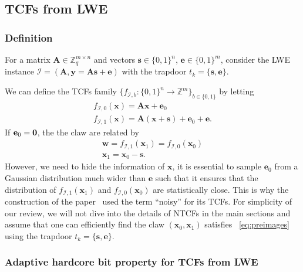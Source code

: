 \documentclass[cryptography,review,submit,pdftex,moreauthors,amsmath,amssymb,aps,strict]{Definitions/mdpi}
\begin{document}
\subsection{TCFs from LWE}
\subsubsection{Definition}
For a matrix $\mathbf{A}\in\mathbb{Z}^{m\times n}_q$ and vectors $\mathbf{s}\in\{0,1\}^n$, $\mathbf{e}\in\{0,1\}^{m}$, consider the LWE instance $\mathcal{I}=(\mathbf{A},\mathbf{y}=\mathbf{A}\mathbf{s}+\mathbf{e})$ with the trapdoor $t_k=\{\mathbf{s},\mathbf{e}\}$. 

We can define the TCFs family  $\{f_{\mathcal{I},b}:\{0,1\}^n\to\mathbb{Z}^{m}\}_{b\in\{0,1\}}$ by letting 
\begin{align}
    f_{\mathcal{I},0}(\mathbf{x})=\mathbf{A}\mathbf{x}+\mathbf{e}_0\\
   f_{\mathcal{I},1}(\mathbf{x})=\mathbf{A}(\mathbf{x}+\mathbf{s})+\mathbf{e}_0+\mathbf{e}.
\end{align} 
If $\mathbf{e}_0 =\bf{0}$, the the claw are related by 
\begin{align}
    \mathbf{w}=f_{\mathcal{I},1}(\mathbf{x}_1)=f_{\mathcal{I},0}(\mathbf{x}_0)\\
    \mathbf{x}_1=\mathbf{x}_0-\mathbf{s}.\label{eq:preimages}
\end{align}
However, we need to hide the information of $\mathbf{x}$, it is essential to sample $\mathbf{e}_0$ from a Gaussian distribution much wider than $\mathbf{e}$ such that it ensures that the distribution of $f_{\mathcal{I},1}(\mathbf{x}_1)$ and $f_{\mathcal{I},0}(\mathbf{x}_0)$ are statistically close. This is why the construction of the paper~\cite{Brakerski18_Interactiveproofofquantumness} used the term ``noisy'' for its TCFs. For simplicity of our review, we will not dive into the details of NTCFs in the main sections and assume that one can efficiently find the claw $(\mathbf{x}_0,\mathbf{x}_1)$ satisfies ~\eqref{eq:preimages} using the trapdoor $t_k=\{\mathbf{s},\mathbf{e}\}$.



\subsubsection{Adaptive hardcore bit property for TCFs from LWE}
\end{document}
